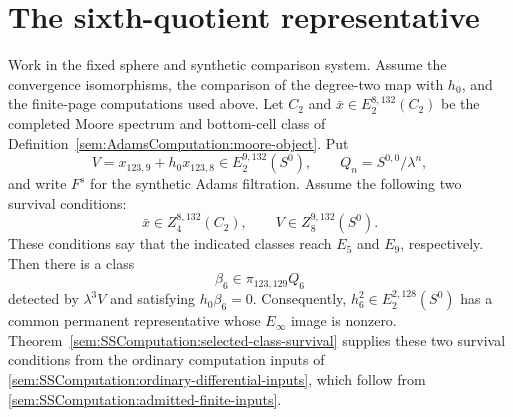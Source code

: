 \section{The sixth-quotient representative}

\begin{lemma}
\label{sem:Main:sixth-quotient-representative}
Work in the fixed sphere and synthetic comparison system.
Assume the convergence isomorphisms, the comparison of the degree-two
map with $h_0$, and the finite-page computations used above.
Let $C_2$ and
$\bar x\in E_2^{8,132}(C_2)$ be the completed Moore spectrum and
bottom-cell class of Definition~\ref{sem:AdamsComputation:moore-object}. Put
\[
 V=x_{123,9}+h_0x_{123,8}\in E_2^{9,132}(S^0),\qquad
 Q_n=S^{0,0}/\lambda^n,
\]
and write $F^s$ for the synthetic Adams filtration. Assume the following
two survival conditions:
\[
 \bar x\in Z_4^{8,132}(C_2),\qquad
 V\in Z_8^{9,132}(S^0).
\]
These conditions say that the indicated classes reach $E_5$ and
$E_9$, respectively. Then there is a class
\[
 \beta_6\in\pi_{123,129}Q_6
\]
detected by $\lambda^3V$ and satisfying $h_0\beta_6=0$.
Consequently, $h_6^2\in E_2^{2,128}(S^0)$ has a common permanent representative
whose $E_\infty$ image is nonzero.
Theorem~\ref{sem:SSComputation:selected-class-survival} supplies these two survival
conditions from the ordinary computation inputs of
\ref{sem:SSComputation:ordinary-differential-inputs}, which follow from
\ref{sem:SSComputation:admitted-finite-inputs}.


\end{lemma}
